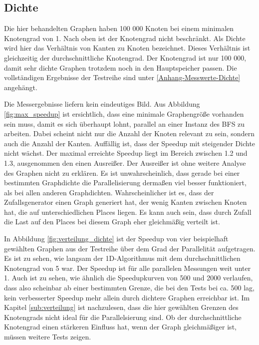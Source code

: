 \subsection{Dichte} %
\label{sub:dichte}
Die hier behandelten Graphen haben 100 000 Knoten bei einem minimalen Knotengrad von 1. Nach oben ist der Knotengrad nicht beschränkt. Als Dichte wird hier das Verhältnis von Kanten zu Knoten bezeichnet. Dieses Verhältnis ist gleichzeitig der durchschnittliche Knotengrad. Der Knotengrad ist nur 100 000, damit sehr dichte Graphen trotzdem noch in den Hauptspeicher passen. Die vollständigen Ergebnisse der Testreihe sind unter \ref{Anhang-Messwerte-Dichte} angehängt.

Die Messergebnisse liefern kein eindeutiges Bild. Aus Abbildung \ref{fig:max_speedup} ist ersichtlich, dass eine minimale Graphengröße vorhanden sein muss, damit es sich überhaupt lohnt, parallel an einer Instanz des BFS zu arbeiten. Dabei scheint nicht nur die Anzahl der Knoten relevant zu sein, sondern auch die Anzahl der Kanten. Auffällig ist, dass der Speedup mit steigender Dichte nicht wächst. Der maximal erreichte Speedup liegt im Bereich zwischen 1.2 und 1.3, ausgenommen den einen Ausreißer. Der Ausreißer ist ohne weitere Analyse des Graphen nicht zu erklären. Es ist unwahrscheinlich, dass gerade bei einer bestimmten Graphdichte die Parallelisierung dermaßen viel besser funktioniert, als bei allen anderen Graphdichten. Wahrscheinlicher ist es, dass der Zufallsgenerator einen Graph generiert hat, der wenig Kanten zwischen Knoten hat, die auf unterschiedlichen Places liegen. Es kann auch sein, dass durch Zufall die Last auf den Places bei diesem Graph eher gleichmäßig verteilt ist. 

In Abbildung \ref{fig:verteilung_dichte} ist der Speedup von vier beispielhaft gewählten Graphen aus der Testreihe über dem Grad der Parallelität aufgetragen. Es ist zu sehen, wie langsam der 1D-Algorithmus mit dem durchschnittlichen Knotengrad von 5 war. Der Speedup ist für alle parallelen Messungen weit unter 1. Auch ist zu sehen, wie ähnlich die Speedupkurven von 500 und 2000 verlaufen, dass also scheinbar ab einer bestimmten Grenze, die bei den Tests bei ca. 500 lag, kein verbesserter Speedup mehr allein durch dichtere Graphen erreichbar ist. Im Kapitel \ref{sub:verteilung} ist nachzulesen, dass die hier gewählten Grenzen des Knotengrads nicht ideal für die Parallelsierung sind. Ob der durchschnittliche Knotengrad einen stärkeren Einfluss hat, wenn der Graph gleichmäßiger ist, müssen weitere Tests zeigen.

